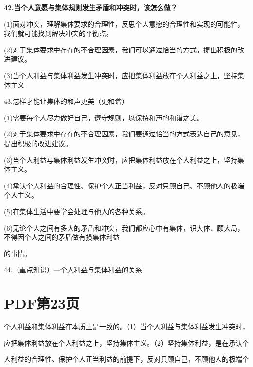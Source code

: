 \documentclass[lang=cn,11pt]{elegantbook}
\begin{document}
\textbf{42.当个人意愿与集体规则发生矛盾和冲突时，该怎么做？}\par

(1)面对冲突，理解集体要求的合理性，反思个人意愿的合理性和实现的可能性，我们就可能找到解决冲突的平衡点。\par

(2)对于集体要求中存在的不合理因素，我们可以通过恰当的方式，提出积极的改进建议。\par

(3)当个人利益与集体利益发生冲突时，应把集体利益放在个人利益之上，坚持集体主义\par

43.怎样才能让集体的和声更美（更和谐）\par

(1)需要每个人尽力做好自己，遵守规则，以保持和声的和谐之美。\par

(2)对于集体要求中存在的不合理因素，我们要通过恰当的方式表达自己的意见，提出积极的改进建议。\par

(3)当个人利益与集体利益发生冲突时，应把集体利益放在个人利益之上，坚持集体主义。\par

(4)承认个人利益的合理性、保护个人正当利益，反对只顾自己、不顾他人的极端个人主义。\par

(5)在集体生活中要学会处理与他人的各种关系。\par

(6)无论个人之间有多大的矛盾和冲突，我们都应心中有集体，识大体、顾大局，不得因个人之间的矛盾做有损集体利益\par

的事情。\par

44.（重点知识）---个人利益与集体利益的关系\par


\section*{PDF第23页}

个人利益和集体利益在本质上是一致的。（1）当个人利益与集体利益发生冲突时，\par

应把集体利益放在个人利益之上，坚持集体主义。（2）坚持集体利益，是在承认个\par

人利益的合理性、保护个人正当利益的前提下，反对只顾自己，不顾他人的极端个\par
\end{document}
